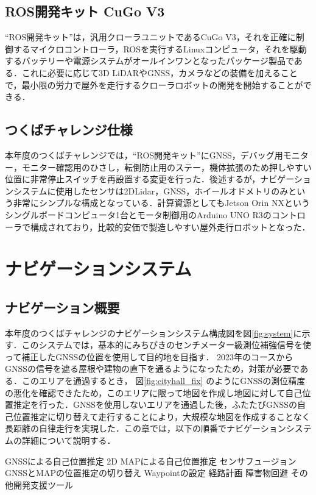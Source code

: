 \documentclass[platex,dvipdfmx]{rbproceedings}
\begin{document}
\subsection{ROS開発キット CuGo V3}
“ROS開発キット”は，汎用クローラユニットであるCuGo V3，それを正確に制御するマイクロコントローラ，ROSを実行するLinuxコンピュータ，それを駆動するバッテリーや電源システムがオールインワンとなったパッケージ製品である．これに必要に応じて3D LiDARやGNSS，カメラなどの装備を加えることで，最小限の労力で屋外を走行するクローラロボットの開発を開始することができる．



\subsection{つくばチャレンジ仕様}
本年度のつくばチャレンジでは，“ROS開発キット”にGNSS，デバッグ用モニター，モニター確認用のひさし，転倒防止用のステー，機体拡張のため押しやすい位置に非常停止スイッチを再設置する変更を行った．後述するが，ナビゲーションシステムに使用したセンサは2DLidar，GNSS，ホイールオドメトリのみという非常にシンプルな構成となっている．計算資源としてもJetson Orin NXというシングルボードコンピュータ1台とモータ制御用のArduino UNO R3のコントローラで構成されており，比較的安価で製造しやすい屋外走行ロボットとなった．

\section{ナビゲーションシステム}
\subsection{ナビゲーション概要}
本年度のつくばチャレンジのナビゲーションシステム構成図を図\ref{fig:system}に示す．このシステムでは，基本的にみちびきのセンチメーター級測位補強信号を使って補正したGNSSの位置を使用して目的地を目指す．
2023年のコースからGNSSの信号を遮る屋根や建物の直下を通るようになったため，対策が必要である．このエリアを通過するとき， 図\ref{fig:cityhall_fix} のようにGNSSの測位精度の悪化を確認できたため，このエリアに限って地図を作成し地図に対して自己位置推定を行った．GNSSを使用しないエリアを通過した後，ふたたびGNSSの自己位置推定に切り替えて走行することにより，大規模な地図を作成することなく長距離の自律走行を実現した．この章では，以下の順番でナビゲーションシステムの詳細について説明する．

GNSSによる自己位置推定
2D MAPによる自己位置推定
センサフュージョン
GNSSとMAPの位置推定の切り替え
Waypointの設定
経路計画
障害物回避
その他開発支援ツール
\end{document}
